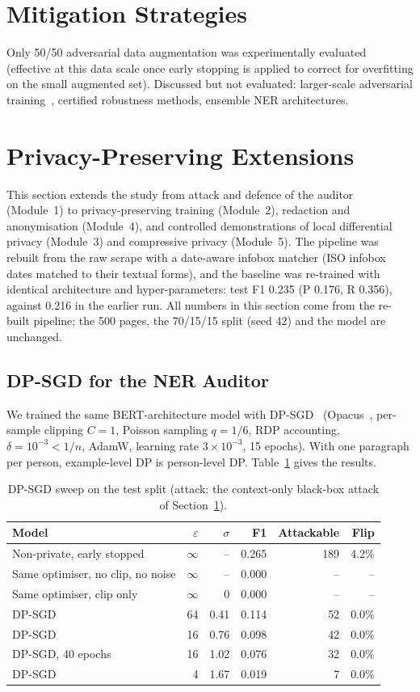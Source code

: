 \documentclass[conference]{IEEEtran}
\begin{document}
\section{Mitigation Strategies}\label{sec:mitigation}
Only 50/50 adversarial data augmentation was experimentally evaluated (effective at this data scale once early stopping is applied to correct for overfitting on the small augmented set). Discussed but not evaluated: larger-scale adversarial training~\cite{simoncini2021seqattack}, certified robustness methods, ensemble NER architectures.

\section{Privacy-Preserving Extensions}\label{sec:extensions}
This section extends the study from attack and defence of the auditor (Module~1) to privacy-preserving training (Module~2), redaction and anonymisation (Module~4), and controlled demonstrations of local differential privacy (Module~3) and compressive privacy (Module~5). The pipeline was rebuilt from the raw scrape with a date-aware infobox matcher (ISO infobox dates matched to their textual forms), and the baseline was re-trained with identical architecture and hyper-parameters: test F1 0.235 (P 0.176, R 0.356), against 0.216 in the earlier run. All numbers in this section come from the re-built pipeline; the 500 pages, the 70/15/15 split (seed 42) and the model are unchanged.

\subsection{DP-SGD for the NER Auditor}
We trained the same BERT-architecture model with DP-SGD~\cite{abadi2016deep} (Opacus~\cite{yousefpour2021opacus}, per-sample clipping $C=1$, Poisson sampling $q=1/6$, RDP accounting, $\delta=10^{-3}<1/n$, AdamW, learning rate $3\times10^{-3}$, 15 epochs). With one paragraph per person, example-level DP is person-level DP. Table~\ref{tab:dp} gives the results.

\begin{table}[H]
\centering\caption{DP-SGD sweep on the test split (attack: the context-only black-box attack of Section~\ref{sec:mitigation}).}\label{tab:dp}
\footnotesize
\begin{tabular}{lrrrrr}
\toprule
Model & $\varepsilon$ & $\sigma$ & F1 & Attackable & Flip \\
\midrule
Non-private, early stopped & $\infty$ & -- & 0.265 & 189 & 4.2\% \\
Same optimiser, no clip, no noise & $\infty$ & -- & 0.000 & -- & -- \\
Same optimiser, clip only & $\infty$ & 0 & 0.000 & -- & -- \\
DP-SGD & 64 & 0.41 & 0.114 & 52 & 0.0\% \\
DP-SGD & 16 & 0.76 & 0.098 & 42 & 0.0\% \\
DP-SGD, 40 epochs & 16 & 1.02 & 0.076 & 32 & 0.0\% \\
DP-SGD & 4 & 1.67 & 0.019 & 7 & 0.0\% \\
\bottomrule
\end{tabular}
\end{table}
\end{document}
